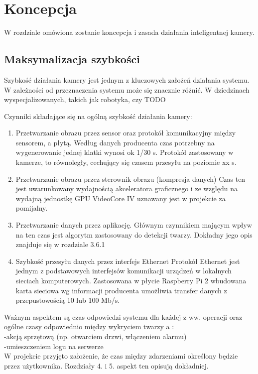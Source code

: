 \chapter{Koncepcja}

W rozdziale omówiona zostanie koncepcja i zasada działania inteligentnej kamery. 

\section{Maksymalizacja szybkości}
 
Szybkość działania kamery jest jednym z kluczowych założeń działania systemu. W zależności od przeznaczenia systemu może się znacznie różnić. W dziedzinach wyspecjalizowanych, takich jak robotyka, czy TODO
\begin{description}
\item Czynniki składające się na ogólną szybkość działania kamery:
	\begin{enumerate}[noitemsep]
	\item Przetwarzanie obrazu przez sensor oraz protokół komunikacyjny między sensorem, a płytą.
Według danych producenta czas potrzebny na wygenerowanie jednej klatki wynosi ok 1/30 s. Protokół zastosowany w kamerze, to równoległy, cechujący się czasem przesyłu na poziomie xx s.
\item Przetwarzanie obrazu przez sterownik obrazu (kompresja danych)
Czas ten jest uwarunkowany wydajnością akceleratora graficznego i  ze względu na wydajną jednostkę GPU VideoCore IV uznawany jest w projekcie za pomijalny.
\item Przetwarzanie danych przez aplikację.
Głównym czynnikiem mającym wpływ na ten czas jest algorytm zastosowany do detekcji twarzy. Dokładny jego opis znajduje się w rozdziale 3.6.1
\item Szybkość przesyłu danych przez interfejs Ethernet
Protokół Ethernet jest jednym z podstawowych interfejsów komunikacji urządzeń w lokalnych sieciach komputerowych. Zastosowana w płycie Raspberry Pi 2 wbudowana karta sieciowa wg informacji producenta umożliwia transfer danych z przepustowością 10 lub 100 Mb/s.
		\end{enumerate}
\end{description}

Ważnym aspektem są czas odpowiedzi systemu dla każdej z ww. operacji oraz ogólne czasy odpowiednio między wykryciem twarzy a : \\
-akcją sprzętową (np. otwarciem drzwi, włączeniem alarmu)\\
-umieszczeniem logu na serwerze\\
W projekcie przyjęto założenie, że czas między zdarzeniami określony będzie przez użytkownika. Rozdziały  4. i 5. aspekt ten opisują dokładniej.

